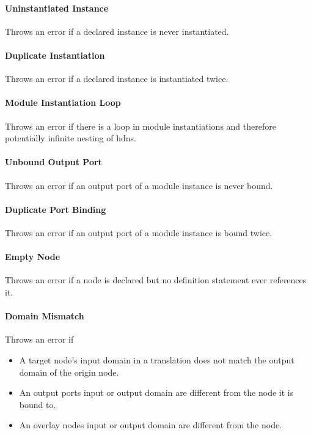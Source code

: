 \documentclass[a4paper,11pt,twoside]{report}
\begin{document}
{{{\paragraph{Uninstantiated Instance}
Throws an error if a declared instance is never instantiated.

\paragraph{Duplicate Instantiation}
Throws an error if a declared instance is instantiated twice.

\paragraph{Module Instantiation Loop}
Throws an error if there is a loop in module instantiations and therefore potentially infinite nesting of \glspl{hdn}.

\paragraph{Unbound Output Port}
Throws an error if an output port of a module instance is never bound.

\paragraph{Duplicate Port Binding}
Throws an error if an output port of a module instance is bound twice.

\paragraph{Empty Node}
Throws an error if a node is declared but no definition statement ever references it.

\paragraph{Domain Mismatch}
Throws an error if
\begin{itemize}
  \item A target node's input domain in a translation does not match the output domain of the origin node.
  \item An output ports input or output domain are different from the node it is bound to.
  \item An overlay nodes input or output domain are different from the node.
\end{itemize}

}}}
\end{document}
